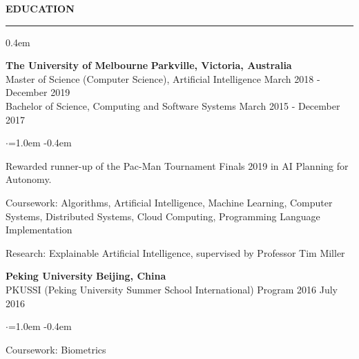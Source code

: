 \documentclass{cv}
\begin{document}
\sectionskip
{} \textbf{EDUCATION}
\sectionlineskip
\hrule
\begin{list}{}{\setlength{\leftmargin}{0em}}
\itemsep 0.4em
\item[]
    \textbf{The University of Melbourne} \hfill \textbf{Parkville, Victoria, Australia}%
    \\
    {Master of Science (Computer Science), Artificial Intelligence} \hfill {March 2018 - December 2019}%
    \\
    {Bachelor of Science, Computing and Software Systems} \hfill {March 2015 - December 2017}%
    \begin{list}{$\cdot$}{\leftmargin=1.0em}
    \itemsep -0.4em \vspace{-0.4em}
        \item Rewarded runner-up of the Pac-Man Tournament Finals 2019 in AI Planning for Autonomy.
        \item Coursework: Algorithms, Artificial Intelligence, Machine Learning, Computer Systems, Distributed Systems, Cloud Computing, Programming Language Implementation
        \item Research: Explainable Artificial Intelligence, supervised by Professor Tim Miller
    \end{list}
\item[]
    \textbf{Peking University} \hfill \textbf{Beijing, China}%
    \\ 
    {PKUSSI (Peking University Summer School International) Program 2016} \hfill {July 2016}%
    \begin{list}{$\cdot$}{\leftmargin=1.0em}
    \itemsep -0.4em \vspace{-0.4em}
        \item Coursework: Biometrics
    \end{list}
\end{list}
\end{document}

